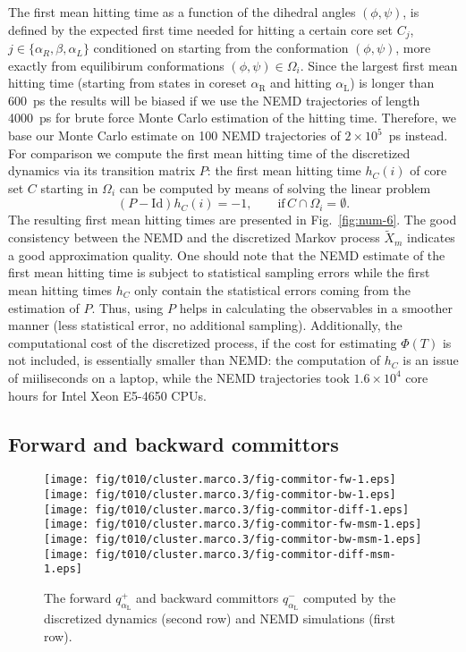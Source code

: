 \documentclass[aps, pre, preprint,unsortedaddress,a4paper,onecolumn]{revtex4}
\newcommand{\vect}[1]{#1}
\newcommand{\fwd}[0]{+}
\newcommand{\bwd}[0]{-}
\newcommand{\id}{\mathrm{Id}}
\newcommand{\confaa}[0]{{\alpha_{\textrm{R}}}}
\newcommand{\confc}[0]{{\alpha_{\textrm{L}}}}
\begin{document}
The first mean hitting time as a function of the dihedral angles $(\phi,\psi)$,
is defined by the expected first time needed for hitting a certain core set $C_j$,
$j\in\{\alpha_R,\beta,\alpha_L\}$ conditioned on starting from the
conformation $(\phi,\psi)$, more exactly from equilibirum conformations $(\phi,\psi)\in\Omega_i$.  Since the largest first mean hitting
time (starting from states in coreset $\confaa$ and hitting $\confc$) is longer than
600~ps the results will be biased if we use the NEMD trajectories of length 4000~ps for brute force Monte Carlo estimation of the hitting time. 
Therefore, we base our Monte Carlo estimate on 100 NEMD
trajectories of $2\times 10^5$~ps instead. For comparison we compute the first mean hitting
time of the discretized dynamics via its transition matrix $\vect P$: the first mean hitting time $h_C(i)$ of core set $C$ starting in $\Omega_i$ can  be computed by means of solving the linear problem \cite{A19-31}
\[
(\vect P-\id) h_C(i) = -1,\qquad \mathrm{if} \, C\cap \Omega_i=\emptyset.
\] 
The resulting first mean hitting times are presented in Fig.~\ref{fig:num-6}.  The
good consistency between the NEMD and the discretized Markov process
$\tilde X_{m}$ indicates a good approximation quality.
One should note that the NEMD estimate of the first mean hitting time is subject to statistical sampling errors while the first mean hitting times $h_C$ only contain the statistical errors coming from the estimation of $\vect P$. 
Thus, using $P$ helps in calculating the observables
in a smoother  manner (less statistical error, no additional sampling).
Additionally, the computational cost of the
discretized process, if the cost for estimating $\Phi(T)$ is not included, is
essentially smaller than NEMD:
the computation of $h_C$ is an issue of miiliseconds on a laptop, while the
NEMD trajectories took $1.6\times 10^4$ core hours for Intel Xeon E5-4650 CPUs.


\subsection{Forward and backward committors}
\label{sec:alanine-committor}
\begin{figure}
  \centering
  \texttt{[image: fig/t010/cluster.marco.3/fig-commitor-fw-1.eps]}
  \texttt{[image: fig/t010/cluster.marco.3/fig-commitor-bw-1.eps]}
  \texttt{[image: fig/t010/cluster.marco.3/fig-commitor-diff-1.eps]}\\
  \texttt{[image: fig/t010/cluster.marco.3/fig-commitor-fw-msm-1.eps]}
  \texttt{[image: fig/t010/cluster.marco.3/fig-commitor-bw-msm-1.eps]}
  \texttt{[image: fig/t010/cluster.marco.3/fig-commitor-diff-msm-1.eps]}
  \caption{The forward $q^\fwd_{\confc}$ and backward committors
    $q^\bwd_{\confc}$ computed by the discretized dynamics (second row) and NEMD simulations (first
    row).}
  \label{fig:num-3}
\end{figure}
\end{document}
